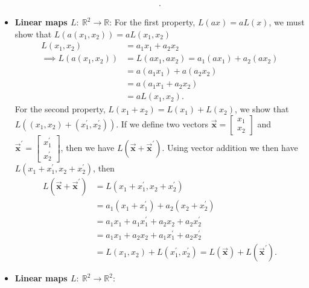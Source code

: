 \documentclass{report}
\begin{document}
\begin{itemize}
\begin{align*}
            .\end{align*}
        \item \textbf{Linear maps $L:\ \mathbb{R}^{2} \to \mathbb{R}$}: 
            \bigbreak \noindent 
            For the first property, $L(ax) = aL(x)$, we must show that $L(a(x_{1}, x_{2}))= aL(x_{1}, x_{2})$
            \begin{align*}
                L(x_{1}, x_{2}) &= a_{1}x_{1} + a_{2}x_{2} \\
                \implies L(a(x_{1}, x_{2})) &= L(ax_{1}, ax_{2}) = a_{1}(ax_{1}) + a_{2}(ax_{2}) \\
                                            &=a(a_{1}x_{1}) + a(a_{2}x_{2}) \\
                                            &=a(a_{1}x_{1} + a_{2}x_{2}) \\
                                            &=aL(x_{1}, x_{2})
            .\end{align*}
            \bigbreak \noindent 
            For the second property, $L(x_{1} + x_{2}) = L(x_{1}) + L(x_{2})$, we show that $L( (x_{1}, x_{2}) + (x^{\prime}_{1}, x^{\prime}_{2}))$. If we define two vectors $\vec{\mathbf{x}} = \begin{bmatrix} x_{1} \\ x_{2} \end{bmatrix} $ and $\vec{\mathbf{x}}^{\prime} = \begin{bmatrix} x^{\prime}_{1}\\ x^{\prime}_{2}\end{bmatrix}$, then we have $L(\vec{\mathbf{x}} + \vec{\mathbf{x}}^{\prime})$. Using vector addition we then have
            $L(x_{1} + x^{\prime}_{1}, x_{2} + x^{\prime}_{2})$, then
            \begin{align*}
                L(\vec{\mathbf{x}} + \vec{\mathbf{x}}^{\prime}) &= L(x_{1} + x^{\prime}_{1}, x_{2} + x^{\prime}_{2}) \\
                &=a_{1}(x_{1} + x^{\prime}_{1}) + a_{2}(x_{2} + x^{\prime}_{2}) \\
                &=a_{1}x_{1} + a_{1}x^{\prime}_{1} +a_{2}x_{2} + a_{2}x^{\prime}_{2} \\
                &=a_{1}x_{1} + a_{2}x_{2} + a_{1}x^{\prime}_{1} + a_{2}x^{\prime}_{2} \\
                &=L(x_{1}, x_{2}) + L(x^{\prime}_{1}, x^{\prime}_{2}) = L(\vec{\mathbf{x}}) + L(\vec{\mathbf{x}}^{\prime})
            .\end{align*}
        \item \textbf{Linear maps $L:\ \mathbb{R}^{2} \to \mathbb{R}^{2}$}: 

\end{itemize}
\end{document}
